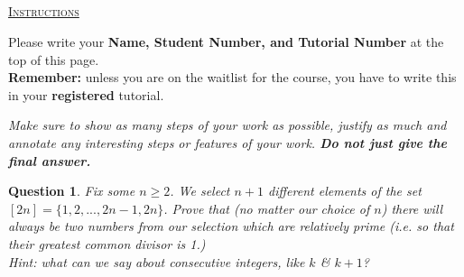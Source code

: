 \documentclass[twoside]{article}
\theoremstyle{mystyle}
\newtheorem{quest}{Question}
\begin{document}
\begin{center}
\section*{}
\vspace{0.1in}
\large \underline{\textsc{Instructions}}
\vspace{0.1in}
\normalsize

Please write your \textbf{Name, Student Number,  and Tutorial Number} at the top of this page.\\

\textbf{Remember:} unless you are on the waitlist for the course, you have to write this in your \textbf{registered} tutorial.
\vspace{0.1in}
\end{center}


\begin{center}
\textit{Make sure to show as many steps of your work as possible, justify as much and annotate any interesting steps or features of your work.  \textbf{Do not just give the final answer.}} \\
\end{center}

\begin{quest}\mbox{}
Fix some $n\geq 2$.  We select $n+1$ different elements of the set $[2n] = \{1,2,...,2n-1, 2n\}$. Prove  that (no matter our choice of $n$) there will always be two numbers from our selection which are relatively prime (i.e. so that their greatest common divisor is 1.)\\

\textit{Hint: what can we say about consecutive integers, like $k$ \& $k+1$?}
\end{quest}

\vspace{20pt}
\end{document}
